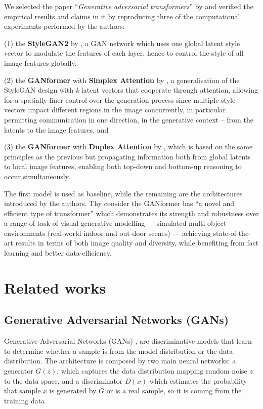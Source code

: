 \documentclass{article}
\begin{document}
	We selected the paper ``\emph{Generative adversarial transformers}'' by 
	\citet{hudson2021generative} and verified the empirical results and claims in it by reproducing three 
	of the computational experiments performed by the authors:
	\begin{enumerate*}
		\item[(1)] the \textbf{StyleGAN2} by \citet{karras2020analyzing}, a GAN network which uses one 
		global latent style vector to modulate the features of each layer, hence to control the style of all 
		image features globally,
		\item[(2)] the \textbf{GANformer} with \textbf{Simplex Attention} by 
		\citet{hudson2021generative}, a generalisation of the StyleGAN design with \textit{k} latent 
		vectors that cooperate through attention, allowing for a spatially finer control over the generation 
		process since multiple style vectors impact different regions in the image concurrently, in 
		particular permitting communication in one direction, in the generative context – from the latents 
		to the image features, and
		\item[(3)] the \textbf{GANformer} with \textbf{Duplex Attention} by \citet{hudson2021generative}, 
		which is based on the same principles as the previous but propagating information both from 
		global latents to local image features, enabling both top-down and bottom-up reasoning to occur 
		simultaneously.
	\end{enumerate*} 
	
	The first model is used as baseline, while the remaining are the architectures introduced by the 
	authors. Thy consider the GANformer has ``a novel and efficient type of transformer'' which 
	demonstrates its strength and robustness over a range of task of visual generative modelling —  
	simulated multi-object environments (real-world indoor and out-door scenes) — achieving 
	state-of-the-art results in terms of both image quality and diversity, while benefiting from fast 
	learning and better data-efficiency. 
	

	\section{Related works}	
	
	\subsection{Generative Adversarial Networks (GANs)}
	Generative Adversarial Networks (GANs) \cite{goodfellow2014generative}, are discriminative models 
	that learn to determine whether a sample is from the model distribution or the data distribution. 
	The architecture is composed by two main neural networks: a generator $G(z)$, which captures the 
	data distribution mapping random noise $z$ to the data space, and a discriminator $D(x)$ which 
	estimates the probability that sample $x$ is generated by $G$ or is a real sample, so it is coming 
	from the training data.
\end{document}
